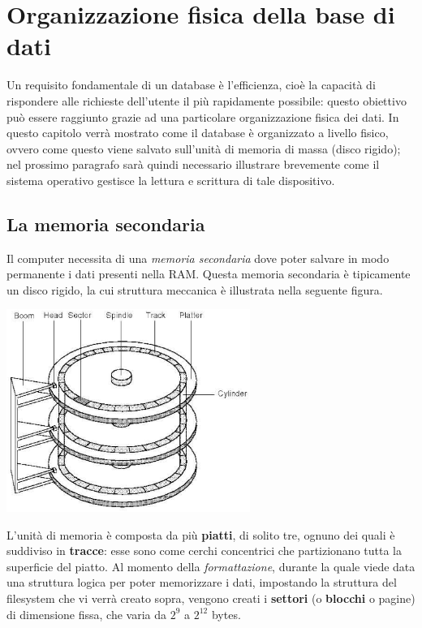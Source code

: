 \section{Organizzazione fisica della base di dati}

Un requisito fondamentale di un database è l'efficienza, cioè la capacità di rispondere alle 
richieste dell'utente il più rapidamente possibile: questo obiettivo può essere raggiunto grazie
ad una particolare organizzazione fisica dei dati. In questo capitolo verrà mostrato come il database
è organizzato a livello fisico, ovvero come questo viene salvato sull'unità di memoria 
di massa (disco rigido); nel prossimo paragrafo sarà quindi necessario illustrare brevemente come il
sistema operativo gestisce la lettura e scrittura di tale dispositivo.

\subsection{La memoria secondaria}
Il computer necessita di una \emph{memoria secondaria} dove poter salvare in modo permanente
i dati presenti nella RAM. Questa memoria secondaria è tipicamente un disco rigido, la cui struttura
meccanica è illustrata nella seguente figura.
\begin{center}
 \includegraphics[width=300px]{immagini-eps/img_5_1.eps}
\end{center}
L'unità di memoria è composta da più \textbf{piatti}, di solito tre, ognuno dei quali è suddiviso
in \textbf{tracce}: esse sono come cerchi concentrici che partizionano tutta la superficie del
piatto. Al momento della \emph{formattazione}, durante la quale viede data una struttura logica per 
poter memorizzare i dati, impostando la struttura del filesystem che vi verrà creato sopra, vengono
creati i \textbf{settori} (o \textbf{blocchi} o pagine) di dimensione fissa, che varia da $2^9$ a $2^{12}$
bytes.\\
